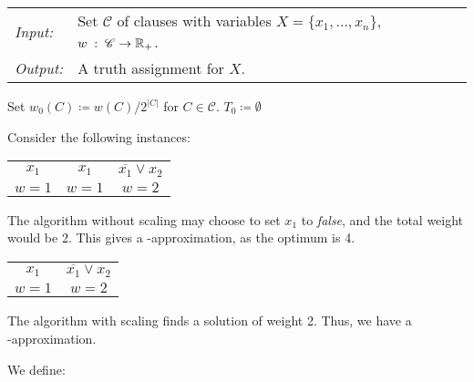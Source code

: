 \documentclass[../skript.tex]{subfiles}
\begin{document}
\begin{algorithmbox}
\begin{tabular}{@{}ll}
\textit{Input:} & Set $\mathscr{C}$ of clauses with variables $X = \{ x_1, \ldots, x_n \}$, $w \; : \; \mathscr{C} \to \mathbb{R}_+$. \\
\textit{Output:} & A truth assignment for $X$.
\end{tabular}
\end{algorithmbox}
\vspace{-7pt}
\begin{algorithm}[H]
Set $w_0(C) \coloneqq w(C)/2^{|C|}$ for $C \in \mathscr{C}$.\;
$T_0 \coloneqq \emptyset$\;
\end{algorithm}
\vspace{-7pt}
\EndAlgorithmLine
\begin{example}
Consider the following instances:
\begin{center}
\begin{tabular}{ccc}
$x_1$ & $x_1$ & $\overline{x_1} \vee x_2$ \\
$w = 1$ & $w=1$ & $w = 2$
\end{tabular}
\end{center}

The algorithm without scaling may choose to set $x_1$ to \textit{false}, and the total weight would be 2. This gives a -approximation, as the optimum is 4.
\begin{center}
\begin{tabular}{cc}
$x_1$ & $\overline{x_1} \vee x_2$ \\
$w = 1$ & $w = 2$
\end{tabular}
\end{center}

The algorithm with scaling finds a solution of weight 2. Thus, we have a \\ -approximation.
\end{example}
We define:
\end{document}

